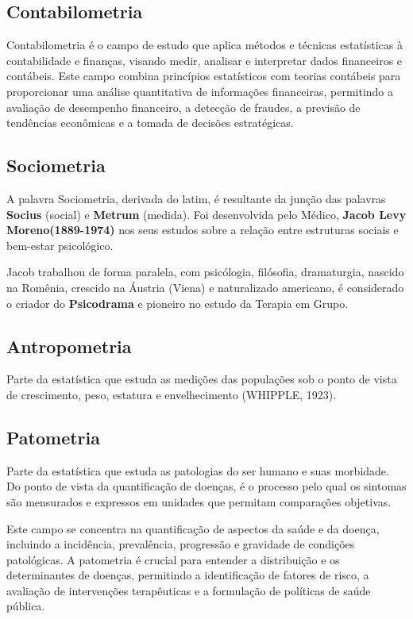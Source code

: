 \subsection{Contabilometria} 

Contabilometria é o campo de estudo que aplica métodos e técnicas estatísticas à contabilidade e finanças, visando medir, analisar e interpretar dados financeiros e contábeis. Este campo combina princípios estatísticos com teorias contábeis para proporcionar uma análise quantitativa de informações financeiras, permitindo a avaliação de desempenho financeiro, a detecção de fraudes, a previsão de tendências econômicas e a tomada de decisões estratégicas.


\subsection{Sociometria}

A palavra Sociometria, derivada do latim, é resultante da junção das palavras \textbf{Socius} (social) e \textbf{Metrum} (medida). Foi desenvolvida pelo Médico, \textbf{Jacob Levy Moreno(1889-1974)} nos seus estudos sobre a relação entre estruturas sociais e bem-estar psicológico.\vskip0.3cm

Jacob trabalhou de forma paralela, com psicólogia, filósofia, dramaturgia, nas\-ci\-do na Romênia, crescido na Áustria (Viena) e naturalizado americano, é considerado o criador do \textbf{Psicodrama} e pioneiro no estudo da Terapia em Grupo. 

\subsection{Antropometria}
Parte da estatística que estuda as medições das populações sob o ponto de vista de crescimento, peso, estatura e envelhecimento (WHIPPLE, 1923).

\subsection{Patometria}

Parte da estatística que estuda as patologias do ser humano e suas morbidade. Do ponto de vista da quantificação de doenças, é o processo pelo qual os sintomas são mensurados e expressos em unidades que permitam comparações objetivas.\vskip0.3cm

Este campo se concentra na quantificação de aspectos da saúde e da doença, incluindo a incidência, prevalência, progressão e gravidade de con\-di\-ções patológicas. A patometria é crucial para entender a distribuição e os determinantes de doenças, permitindo a identificação de fatores de risco, a avaliação de in\-ter\-ven\-ções terapêuticas e a formulação de políticas de saúde pública.

